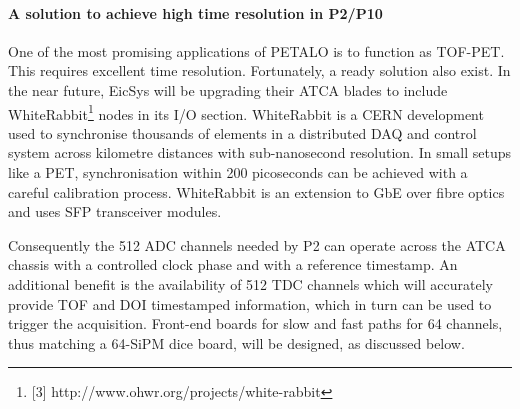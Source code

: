 \paragraph{A solution to achieve high time resolution in P2/P10}
%
One of the most promising applications of PETALO is to function as TOF-PET. This requires excellent time resolution. Fortunately, a ready solution also exist. In the near future, EicSys will be upgrading their ATCA blades to include WhiteRabbit\footnote{[3] http://www.ohwr.org/projects/white-rabbit} nodes in its I/O section. WhiteRabbit is a CERN development used to synchronise thousands of elements in a distributed DAQ and control system across kilometre distances with sub-nanosecond resolution. In small setups like a PET, synchronisation within 200 picoseconds can be achieved with a careful calibration process. WhiteRabbit is an extension to GbE over fibre optics and uses SFP transceiver modules.
%
%
%

Consequently the 512 ADC channels needed by P2 can operate across the ATCA chassis with a controlled clock phase and with a reference timestamp. An additional benefit is the availability of 512 TDC channels which will accurately provide TOF and DOI timestamped information, which in turn can be used to trigger the acquisition. Front-end boards for slow and fast paths for 64 channels, thus matching a 64-SiPM dice board, will be designed, as discussed below.
%
%
%
